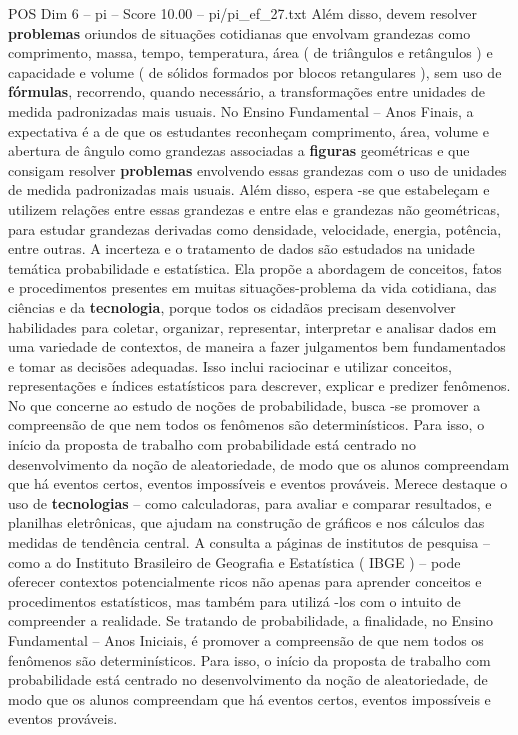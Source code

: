 \begin{textsample}{POS Dim 6 – pi – Score 10.00 – pi/pi\_ef\_27.txt}
Além disso, devem resolver \textbf{problemas} oriundos de situações cotidianas que envolvam grandezas como comprimento, massa, tempo, temperatura, área ( de triângulos e retângulos ) e capacidade e volume ( de sólidos formados por blocos retangulares ), sem uso de \textbf{fórmulas}, recorrendo, quando necessário, a transformações entre unidades de medida padronizadas mais usuais.
No Ensino Fundamental – Anos Finais, a expectativa é a de que os estudantes reconheçam comprimento, área, volume e abertura de ângulo como grandezas associadas a \textbf{figuras} geométricas e que consigam resolver \textbf{problemas} envolvendo essas grandezas com o uso de unidades de medida padronizadas mais usuais.
Além disso, espera -se que estabeleçam e utilizem relações entre essas grandezas e entre elas e grandezas não geométricas, para estudar grandezas derivadas como densidade, velocidade, energia, potência, entre outras.
A incerteza e o tratamento de dados são estudados na unidade temática probabilidade e estatística.
Ela propõe a abordagem de conceitos, fatos e procedimentos presentes em muitas situações-problema da vida cotidiana, das ciências e da \textbf{tecnologia}, porque todos os cidadãos precisam desenvolver habilidades para coletar, organizar, representar, interpretar e analisar dados em uma variedade de contextos, de maneira a fazer julgamentos bem fundamentados e tomar as decisões adequadas.
Isso inclui raciocinar e utilizar conceitos, representações e índices estatísticos para descrever, explicar e predizer fenômenos.
No que concerne ao estudo de noções de probabilidade, busca -se promover a compreensão de que nem todos os fenômenos são determinísticos.
Para isso, o início da proposta de trabalho com probabilidade está centrado no desenvolvimento da noção de aleatoriedade, de modo que os alunos compreendam que há eventos certos, eventos impossíveis e eventos prováveis.
Merece destaque o uso de \textbf{tecnologias} – como calculadoras, para avaliar e comparar resultados, e planilhas eletrônicas, que ajudam na construção de gráficos e nos cálculos das medidas de tendência central.
A consulta a páginas de institutos de pesquisa – como a do Instituto Brasileiro de Geografia e Estatística ( IBGE ) – pode oferecer contextos potencialmente ricos não apenas para aprender conceitos e procedimentos estatísticos, mas também para utilizá -los com o intuito de compreender a realidade.
Se tratando de probabilidade, a finalidade, no Ensino Fundamental – Anos Iniciais, é promover a compreensão de que nem todos os fenômenos são determinísticos.
Para isso, o início da proposta de trabalho com probabilidade está centrado no desenvolvimento da noção de aleatoriedade, de modo que os alunos compreendam que há eventos certos, eventos impossíveis e eventos prováveis.

\end{textsample}
